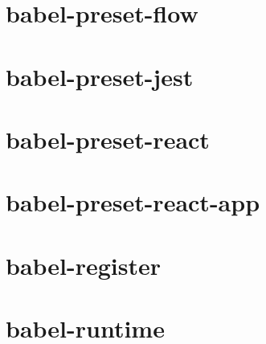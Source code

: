 \documentclass[twoside]{book}
\newcommand{\+}{\discretionary{\mbox{\scriptsize$\hookleftarrow$}}{}{}}
\begin{document}
\chapter{babel-\/preset-\/flow}
\label{md__c_1_workspace_demo_src_main_script_node_modules_babel-preset-flow__r_e_a_d_m_e}

\chapter{babel-\/preset-\/jest}
\label{md__c_1_workspace_demo_src_main_script_node_modules_babel-preset-jest__r_e_a_d_m_e}

\chapter{babel-\/preset-\/react}
\label{md__c_1_workspace_demo_src_main_script_node_modules_babel-preset-react__r_e_a_d_m_e}

\chapter{babel-\/preset-\/react-\/app}
\label{md__c_1_workspace_demo_src_main_script_node_modules_babel-preset-react-app__r_e_a_d_m_e}

\chapter{babel-\/register}
\label{md__c_1_workspace_demo_src_main_script_node_modules_babel-register__r_e_a_d_m_e}

\chapter{babel-\/runtime}
\label{md__c_1_workspace_demo_src_main_script_node_modules_babel-runtime__r_e_a_d_m_e}

\end{document}

